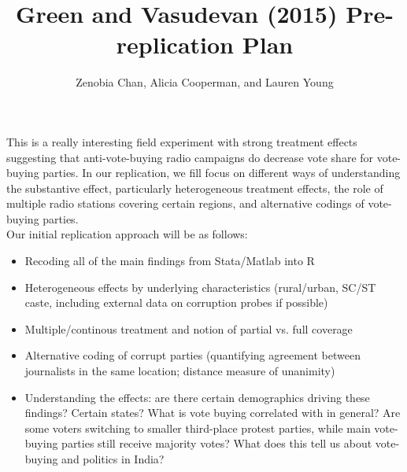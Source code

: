 \documentclass[12pt,letterpaper]{article}
\author{Zenobia Chan, Alicia Cooperman, and Lauren Young}
\title{Green and Vasudevan (2015) Pre-replication Plan}
\begin{document}
\maketitle
This is a really interesting field experiment with strong treatment effects suggesting that anti-vote-buying radio campaigns do decrease vote share for vote-buying parties. In our replication, we fill focus on different ways of understanding the substantive effect, particularly heterogeneous treatment effects, the role of multiple radio stations covering certain regions, and alternative codings of vote-buying parties.\\

Our initial replication approach will be as follows:
\begin{itemize}
\item Recoding all of the main findings from Stata/Matlab into R 
\item Heterogeneous effects by underlying characteristics (rural/urban, SC/ST caste, including external data on corruption probes if possible)
\item Multiple/continous treatment and notion of partial vs. full coverage
\item Alternative coding of corrupt parties (quantifying agreement between journalists in the same location; distance measure of unanimity)
\item Understanding the effects: are there certain demographics driving these findings? Certain states? What is vote buying correlated with in general? Are some voters switching to smaller third-place protest parties, while main vote-buying parties still receive majority votes? What does this tell us about vote-buying and politics in India?
\end{itemize}
\end{document}
